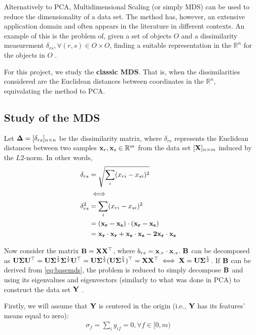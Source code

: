 Alternatively to PCA, Multidimensional Scaling (or simply MDS) can be used to reduce the dimensionality of a data set. The method has, however, an extensive application domain and often appears in the literature in different contexts. An example of this is the problem of, given a set of objects $O$ and a dissimilarity measurement $\delta_{rs}, \forall (r, s) \in O\times O$, finding a suitable representation in the $\mathbb{R}^n$ for the objects in $O$ \cite{cox2001}.

For this project, we study the \textbf{classic MDS}. That is, when the dissimilarities considered are the Euclidean distances between coordinates in the $\mathbb{R}^n$, equivalating the method to PCA.

\subsection{Study of the MDS}

Let $\mathbf{\Delta} = [\delta_{rs}]_{n\times n}$ be the dissimilarity matrix, where $\delta_{rs}$ represents the Euclidean distances between two samples $\mathbf{x}_r, \mathbf{x}_s\in \mathbb{R}^m$ from the data set $[\mathbf{X}]_{n\times m}$ induced by the $L2$-norm. In other words,
\begin{align}
\label{eq:basemds}
\begin{split}
  \delta_{rs}  &= \sqrt{\sum_i (x_{ri}-x_{si})^2} \\
  &\iff \\
  \delta_{rs}^2 &= \sum_i (x_{ri}-x_{si})^2 \\
  &= (\mathbf{x_r-x_s}) \cdot (\mathbf{x_r-x_s}) \\
  &= \mathbf{x_r\cdot x_r + x_s\cdot x_s -2x_r\cdot x_s}
\end{split}
\end{align}

Now consider the matrix $\mathbf{B=XX^\top}$, where $b_{rs}=\mathbf{x}_{.r}\cdot \mathbf{x}_{.s}$. $\mathbf{B}$ can be decomposed as $\mathbf{U\Sigma U^\top} = \mathbf{U} \mathbf{\Sigma}^\frac{1}{2} \mathbf{\Sigma}^\frac{1}{2} \mathbf{U}^\top=\mathbf{U} \mathbf{\Sigma}^\frac{1}{2} (\mathbf{U} \mathbf{\Sigma}^\frac{1}{2})^\top = \mathbf{XX^\top}\iff \mathbf{X=U} \mathbf{\Sigma}^\frac{1}{2}$. If $\mathbf{B}$ can be derived from \ref{eq:basemds}, the problem is reduced to simply decompose $\mathbf{B}$ and using its eigenvalues and eigenvectors (similarly to what was done in PCA) to construct the data set $\mathbf{Y}$ \cite{cox2001}.

Firstly, we will assume that $\mathbf{Y}$ is centered in the origin (i.e., $\mathbf{Y}$ has its features' means equal to zero):
\begin{align}
	\label{eq:mds_zeromean}
	\sigma_f = \sum_i y_{if} = 0, \forall f\in [0, m)
\end{align}

